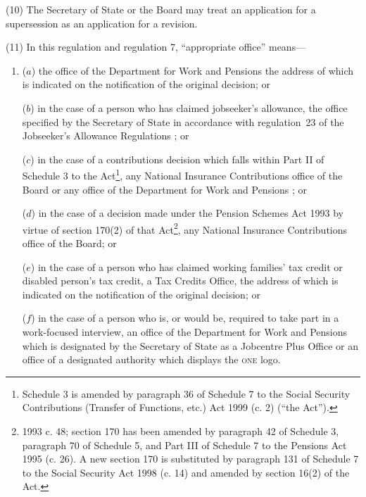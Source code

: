 \documentclass[12pt,a4paper]{article}
\begin{document}
(10) The Secretary of State 
or the Board  %
may treat an application for a supersession as an application for a revision.

(11) In this regulation and regulation 7, “appropriate office” means---
\begin{enumerate}\item[]
($a$) the office of the 
Department for Work and Pensions  %
the address of which is indicated on the notification of the original decision; or

($b$) in the case of a person who has claimed jobseeker’s allowance, the office specified by the Secretary of State in accordance with regulation~23 of the Jobseeker’s Allowance Regulations%
; or

    ($c$) 
    in the case of a contributions decision which falls within Part II of Schedule 3 to the Act\footnote{\frenchspacing Schedule 3 is amended by paragraph 36 of Schedule 7 to the Social Security Contributions (Transfer of Functions, etc.) Act 1999 (c. 2) (“the Act”).}, any National Insurance Contributions office of the Board or any office of the 
Department for Work and Pensions%
; or

    ($d$) 
    in the case of a decision made under the Pension Schemes Act 1993 by virtue of section 170(2) of that Act\footnote{1993 c. 48; section 170 has been amended by paragraph 42 of Schedule 3, paragraph 70 of Schedule 5, and Part III of Schedule 7 to the Pensions Act 1995 (c. 26). A new section 170 is substituted by paragraph 131 of Schedule 7 to the Social Security Act 1998 (c. 14) and amended by section 16(2) of the Act.}, any National Insurance Contributions office of the Board;
or

($e$) in the case of a person who has claimed working families' tax credit or disabled person’s tax credit, a Tax Credits Office, the address of which is indicated on the notification of the original decision;
or


($f$) in the case of a person who is, or would be, required to take part in a work-focused interview, an office of the Department for Work and Pensions which is designated by the Secretary of State as a Jobcentre Plus Office or an office of a designated authority which displays the \textsc{\lowercase{ONE}} logo.
\end{enumerate}
\end{document}
